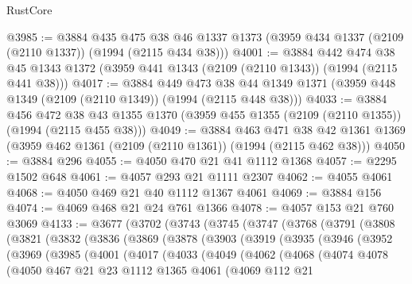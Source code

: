\begin{lexlean}{RustCore}
\begin{coremodule}
@3985 := @3884
    @435
    @475
    @38
    @46
    @1337
    @1373
    (@3959 @434 @1337 (@2109 (@2110 @1337)) (@1994 (@2115 @434 @38)))
@4001 := @3884
    @442
    @474
    @38
    @45
    @1343
    @1372
    (@3959 @441 @1343 (@2109 (@2110 @1343)) (@1994 (@2115 @441 @38)))
@4017 := @3884
    @449
    @473
    @38
    @44
    @1349
    @1371
    (@3959 @448 @1349 (@2109 (@2110 @1349)) (@1994 (@2115 @448 @38)))
@4033 := @3884
    @456
    @472
    @38
    @43
    @1355
    @1370
    (@3959 @455 @1355 (@2109 (@2110 @1355)) (@1994 (@2115 @455 @38)))
@4049 := @3884
    @463
    @471
    @38
    @42
    @1361
    @1369
    (@3959 @462 @1361 (@2109 (@2110 @1361)) (@1994 (@2115 @462 @38)))
@4050 := @3884 @296
@4055 := @4050 @470 @21 @41 @1112 @1368
@4057 := @2295 @1502 @648
@4061 := @4057 @293 @21 @1111 @2307
@4062 := @4055 @4061
@4068 := @4050 @469 @21 @40 @1112 @1367 @4061
@4069 := @3884 @156
@4074 := @4069 @468 @21 @24 @761 @1366
@4078 := @4057 @153 @21 @760 @3069
@4133 := @3677
    (@3702
      (@3743
        (@3745
          (@3747
            (@3768
              (@3791
                (@3808
                  (@3821
                    (@3832
                      (@3836
                        (@3869
                          (@3878
                            (@3903
                              (@3919
                                (@3935
                                  (@3946
                                    (@3952
                                      (@3969
                                        (@3985
                                          (@4001
                                            (@4017
                                              (@4033
                                                (@4049
                                                  (@4062
                                                    (@4068
                                                      (@4074
                                                        @4078
                                                        (@4050
                                                          @467
                                                          @21
                                                          @23
                                                          @1112
                                                          @1365
                                                          @4061
                                                          (@4069
                                                            @112
                                                            @21

\end{coremodule}
\end{lexlean}
